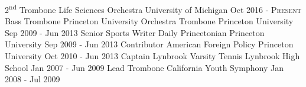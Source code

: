 

\begin{cventries}
  \cventry
    {2\textsuperscript{nd} Trombone} %
    {Life Sciences Orchestra} %
    {University of Michigan} %
    {Oct 2016 - \textsc{Present}} %
    {}
\ifoutdated
  \cventry
    {Bass Trombone} %
    {Princeton University Orchestra Trombone} %
    {Princeton University} %
    {Sep 2009 - Jun 2013} %
    {}
  \cventry
    {Senior Sports Writer} %
    {Daily Princetonian} %
    {Princeton University} %
    {Sep 2009 - Jun 2013} %
    {}
  \cventry
    {Contributor} %
    {American Foreign Policy} %
    {Princeton University} %
    {Oct 2010 - Jun 2013} %
    {}
  \cventry
    {Captain} %
    {Lynbrook Varsity Tennis} %
    {Lynbrook High School} %
    {Jan 2007 - Jun 2009} %
    {}
  \cventry
    {Lead Trombone} %
    {California Youth Symphony} %
    {} %
    {Jan 2008 - Jul 2009} %
    {}
\fi
\end{cventries}
